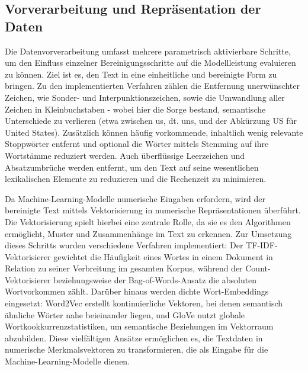 \subsection{Vorverarbeitung und Repräsentation der Daten}
\label{sec:vorverarbeitung}

Die Datenvorverarbeitung umfasst mehrere parametrisch aktivierbare Schritte, um den Einfluss einzelner Bereinigungsschritte auf die Modellleistung evaluieren zu können. Ziel ist es, den Text in eine einheitliche und bereinigte Form zu bringen. Zu den implementierten Verfahren zählen die Entfernung unerwünschter Zeichen, wie Sonder- und Interpunktionszeichen, sowie die Umwandlung aller Zeichen in Kleinbuchstaben - wobei hier die Sorge bestand, semantische Unterschiede zu verlieren (etwa zwischen us, dt. uns, und der Abkürzung US für United States). Zusätzlich können häufig vorkommende, inhaltlich wenig relevante Stoppwörter entfernt und optional die Wörter mittels Stemming auf ihre Wortstämme reduziert werden. Auch überflüssige Leerzeichen und Absatzumbrüche werden entfernt, um den Text auf seine wesentlichen lexikalischen Elemente zu reduzieren und die Rechenzeit zu minimieren.

Da Machine-Learning-Modelle numerische Eingaben erfordern, wird der bereinigte Text mittels Vektorisierung in numerische Repräsentationen überführt. Die Vektorisierung spielt hierbei eine zentrale Rolle, da sie es den Algorithmen ermöglicht, Muster und Zusammenhänge im Text zu erkennen. Zur Umsetzung dieses Schritts wurden verschiedene Verfahren implementiert: Der TF-IDF-Vektorisierer gewichtet die Häufigkeit eines Wortes in einem Dokument in Relation zu seiner Verbreitung im gesamten Korpus, während der Count-Vektorisierer beziehungsweise der Bag-of-Words-Ansatz die absoluten Wortvorkommen zählt. Darüber hinaus werden dichte Wort-Embeddings eingesetzt: Word2Vec erstellt kontinuierliche Vektoren, bei denen semantisch ähnliche Wörter nahe beieinander liegen, und GloVe nutzt globale Wortkookkurrenzstatistiken, um semantische Beziehungen im Vektorraum abzubilden. Diese vielfältigen Ansätze ermöglichen es, die Textdaten in numerische Merkmalsvektoren zu transformieren, die als Eingabe für die Machine-Learning-Modelle dienen.

